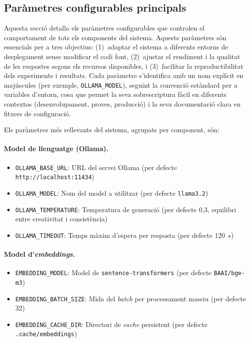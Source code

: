 \documentclass[CAT]{TFUOC}%
\begin{document}
\subsection{Paràmetres configurables principals}

Aquesta secció detalla els paràmetres configurables que controlen el comportament de tots els components del sistema. Aquests paràmetres són essencials per a tres objectius: (1)~adaptar el sistema a diferents entorns de desplegament sense modificar el codi font, (2)~ajustar el rendiment i la qualitat de les respostes segons els recursos disponibles, i (3)~facilitar la reproductibilitat dels experiments i resultats. Cada paràmetre s'identifica amb un nom explícit en majúscules (per exemple, \texttt{OLLAMA\_MODEL}), seguint la convenció estàndard per a variables d'entorn, cosa que permet la seva sobrescriptura fàcil en diferents contextos (desenvolupament, proves, producció) i la seva documentació clara en fitxers de configuració.

Els paràmetres més rellevants del sistema, agrupats per component, són:

\paragraph{Model de llenguatge (Ollama).}
\begin{itemize}
    \item \texttt{OLLAMA\_BASE\_URL}: URL del servei Ollama (per defecte \texttt{http://localhost:11434})
    \item \texttt{OLLAMA\_MODEL}: Nom del model a utilitzar (per defecte \texttt{llama3.2})
    \item \texttt{OLLAMA\_TEMPERATURE}: Temperatura de generació (per defecte 0,3, equilibri entre creativitat i consistència)
    \item \texttt{OLLAMA\_TIMEOUT}: Temps màxim d'espera per resposta (per defecte 120~s)
\end{itemize}

\paragraph{Model d'\textit{embeddings}.}
\begin{itemize}
    \item \texttt{EMBEDDING\_MODEL}: Model de \texttt{sentence-transformers} (per defecte \texttt{BAAI/bge-m3})
    \item \texttt{EMBEDDING\_BATCH\_SIZE}: Mida del \textit{batch} per processament massiu (per defecte 32)
    \item \texttt{EMBEDDING\_CACHE\_DIR}: Directori de \textit{cache} persistent (per defecte \texttt{.cache/embeddings})
\end{itemize}
\end{document}
